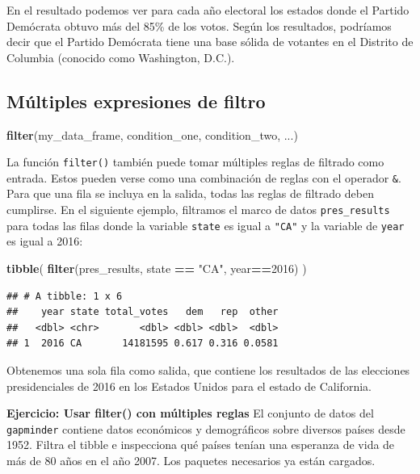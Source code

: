 \documentclass[
]{book}
\newenvironment{Shaded}{\begin{snugshade}}{\end{snugshade}}
\newcommand{\DecValTok}[1]{\textcolor[rgb]{0.00,0.00,0.81}{#1}}
\newcommand{\KeywordTok}[1]{\textcolor[rgb]{0.13,0.29,0.53}{\textbf{#1}}}
\newcommand{\NormalTok}[1]{#1}
\newcommand{\OperatorTok}[1]{\textcolor[rgb]{0.81,0.36,0.00}{\textbf{#1}}}
\newcommand{\StringTok}[1]{\textcolor[rgb]{0.31,0.60,0.02}{#1}}
\begin{document}
En el resultado podemos ver para cada año electoral los estados donde el Partido Demócrata obtuvo más del 85\% de los votos. Según los resultados, podríamos decir que el Partido Demócrata tiene una base sólida de votantes en el Distrito de Columbia (conocido como Washington, D.C.).

\hypertarget{muxfaltiples-expresiones-de-filtro}{%
\subsection{Múltiples expresiones de filtro}\label{muxfaltiples-expresiones-de-filtro}}

\begin{Shaded}
\begin{Highlighting}[]
\KeywordTok{filter}\NormalTok{(my_data_frame, condition_one, condition_two, ...)}
\end{Highlighting}
\end{Shaded}

La función \texttt{filter()} también puede tomar múltiples reglas de filtrado como entrada. Estos pueden verse como una combinación de reglas con el operador \texttt{\&}. Para que una fila se incluya en la salida, todas las reglas de filtrado deben cumplirse. En el siguiente ejemplo, filtramos el marco de datos \texttt{pres\_results} para todas las filas donde la variable \texttt{state} es igual a \texttt{"CA"} y la variable de \texttt{year} es igual a 2016:

\begin{Shaded}
\begin{Highlighting}[]
\KeywordTok{tibble}\NormalTok{(}
\KeywordTok{filter}\NormalTok{(pres_results, state }\OperatorTok{==}\StringTok{ "CA"}\NormalTok{, year}\OperatorTok{==}\DecValTok{2016}\NormalTok{)}
\NormalTok{)}
\end{Highlighting}
\end{Shaded}

\begin{verbatim}
## # A tibble: 1 x 6
##    year state total_votes   dem   rep  other
##   <dbl> <chr>       <dbl> <dbl> <dbl>  <dbl>
## 1  2016 CA       14181595 0.617 0.316 0.0581
\end{verbatim}

Obtenemos una sola fila como salida, que contiene los resultados de las elecciones presidenciales de 2016 en los Estados Unidos para el estado de California.

\textbf{Ejercicio: Usar filter() con múltiples reglas}
El conjunto de datos del \texttt{gapminder} contiene datos económicos y demográficos sobre diversos países desde 1952. Filtra el tibble e inspecciona qué países tenían una esperanza de vida de más de 80 años en el año 2007. Los paquetes necesarios ya están cargados.
\end{document}
